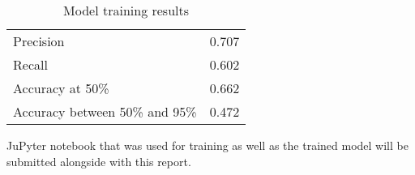 \documentclass[10pt,twocolumn,letterpaper]{article}
\begin{document}
\begin{table}[!h]
    \begin{center}
        \caption{Model training results}\label{results-table}
        \begin{tabular}{ l c }
            \toprule
            Precision & 0.707 \\
            Recall & 0.602 \\
            Accuracy at 50\% & 0.662 \\
            Accuracy between 50\% and 95\% & 0.472 \\
            \bottomrule
        \end{tabular}
    \end{center}
\end{table}

JuPyter notebook that was used for training as well as the trained model will be submitted alongside with this report.


{
    \small
    
    
}
\end{document}
